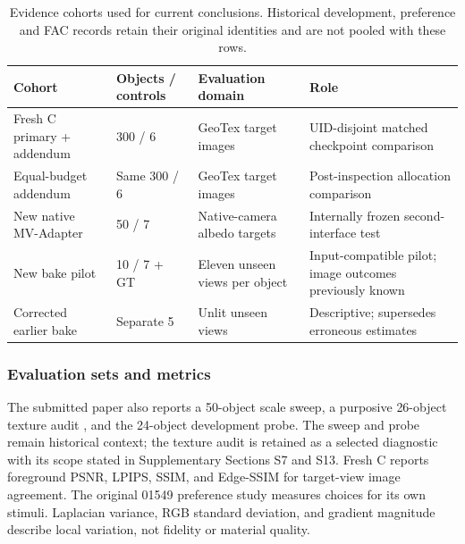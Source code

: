 \documentclass[times,twocolumn,final]{elsarticle}
\providecommand{\DIFadd}[1]{{\protect\color{blue} \sf #1}} %
\providecommand{\DIFaddbegin}{} %
\providecommand{\DIFaddend}{} %
\providecommand{\DIFaddFL}[1]{\DIFadd{#1}} %
\renewcommand{\DIFaddFL}[1]{#1}
\begin{document}
  \DIFaddbegin \begin{table}[t]\centering\scriptsize
\caption{Evidence cohorts used for current conclusions. Historical development, preference and FAC records retain their original identities and are not pooled with these rows.}
\label{tab:cohort-map}
\begin{tabular}{llll}
\toprule \DIFaddFL{Cohort }& \DIFaddFL{Objects / controls }& \DIFaddFL{Evaluation domain }& \DIFaddFL{Role }\\
\midrule
\DIFaddFL{Fresh C primary + addendum }& \DIFaddFL{300 / 6 }& \DIFaddFL{GeoTex target images }& \DIFaddFL{UID-disjoint matched checkpoint comparison }\\
\DIFaddFL{Equal-budget addendum }& \DIFaddFL{Same 300 / 6 }& \DIFaddFL{GeoTex target images }& \DIFaddFL{Post-inspection allocation comparison }\\
\DIFaddFL{New native MV-Adapter }& \DIFaddFL{50 / 7 }& \DIFaddFL{Native-camera albedo targets }& \DIFaddFL{Internally frozen second-interface test }\\
\DIFaddFL{New bake pilot }& \DIFaddFL{10 / 7 + GT }& \DIFaddFL{Eleven unseen views per object }& \DIFaddFL{Input-compatible pilot; image outcomes previously known }\\
\DIFaddFL{Corrected earlier bake }& \DIFaddFL{Separate 5 }& \DIFaddFL{Unlit unseen views }& \DIFaddFL{Descriptive; supersedes erroneous estimates }\\
\bottomrule\end{tabular}
\end{table}
\DIFaddend 

\subsubsection{Evaluation sets and metrics}

  \DIFaddbegin \DIFadd{The submitted paper also reports }\DIFaddend a 50-object   \DIFaddbegin \DIFadd{scale sweep, a purposive }\DIFaddend 26-object texture audit  \DIFaddbegin \DIFadd{, }\DIFaddend and   the 24-object  
 \DIFaddbegin \DIFadd{development probe. The sweep and probe remain historical context; the texture audit is retained as a selected diagnostic with its scope stated in Supplementary Sections S7 and S13. Fresh C reports foreground PSNR, LPIPS, SSIM, and }\DIFaddend Edge-SSIM   \DIFaddbegin \DIFadd{for target-view image agreement. The original 01549 preference study measures choices for its own stimuli. }\DIFaddend Laplacian variance, RGB standard deviation, and gradient magnitude  
 \DIFaddbegin \DIFadd{describe local variation, not fidelity or material quality}\DIFaddend .
\end{document}

